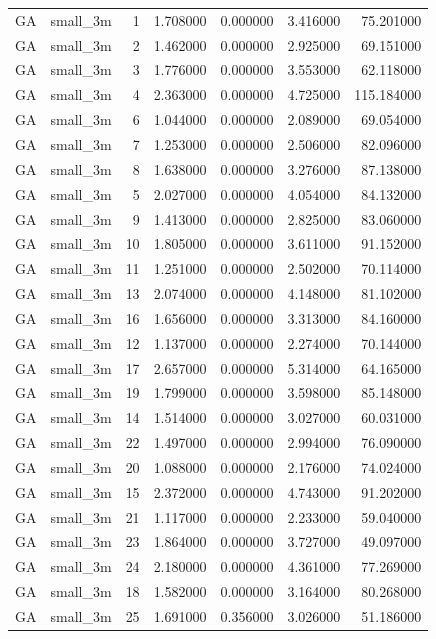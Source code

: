 \begin{tabular}{llrrrrr}
GA & small_3m & 1 & 1.708000 & 0.000000 & 3.416000 & 75.201000 \\
GA & small_3m & 2 & 1.462000 & 0.000000 & 2.925000 & 69.151000 \\
GA & small_3m & 3 & 1.776000 & 0.000000 & 3.553000 & 62.118000 \\
GA & small_3m & 4 & 2.363000 & 0.000000 & 4.725000 & 115.184000 \\
GA & small_3m & 6 & 1.044000 & 0.000000 & 2.089000 & 69.054000 \\
GA & small_3m & 7 & 1.253000 & 0.000000 & 2.506000 & 82.096000 \\
GA & small_3m & 8 & 1.638000 & 0.000000 & 3.276000 & 87.138000 \\
GA & small_3m & 5 & 2.027000 & 0.000000 & 4.054000 & 84.132000 \\
GA & small_3m & 9 & 1.413000 & 0.000000 & 2.825000 & 83.060000 \\
GA & small_3m & 10 & 1.805000 & 0.000000 & 3.611000 & 91.152000 \\
GA & small_3m & 11 & 1.251000 & 0.000000 & 2.502000 & 70.114000 \\
GA & small_3m & 13 & 2.074000 & 0.000000 & 4.148000 & 81.102000 \\
GA & small_3m & 16 & 1.656000 & 0.000000 & 3.313000 & 84.160000 \\
GA & small_3m & 12 & 1.137000 & 0.000000 & 2.274000 & 70.144000 \\
GA & small_3m & 17 & 2.657000 & 0.000000 & 5.314000 & 64.165000 \\
GA & small_3m & 19 & 1.799000 & 0.000000 & 3.598000 & 85.148000 \\
GA & small_3m & 14 & 1.514000 & 0.000000 & 3.027000 & 60.031000 \\
GA & small_3m & 22 & 1.497000 & 0.000000 & 2.994000 & 76.090000 \\
GA & small_3m & 20 & 1.088000 & 0.000000 & 2.176000 & 74.024000 \\
GA & small_3m & 15 & 2.372000 & 0.000000 & 4.743000 & 91.202000 \\
GA & small_3m & 21 & 1.117000 & 0.000000 & 2.233000 & 59.040000 \\
GA & small_3m & 23 & 1.864000 & 0.000000 & 3.727000 & 49.097000 \\
GA & small_3m & 24 & 2.180000 & 0.000000 & 4.361000 & 77.269000 \\
GA & small_3m & 18 & 1.582000 & 0.000000 & 3.164000 & 80.268000 \\
GA & small_3m & 25 & 1.691000 & 0.356000 & 3.026000 & 51.186000 \\

\end{tabular}
